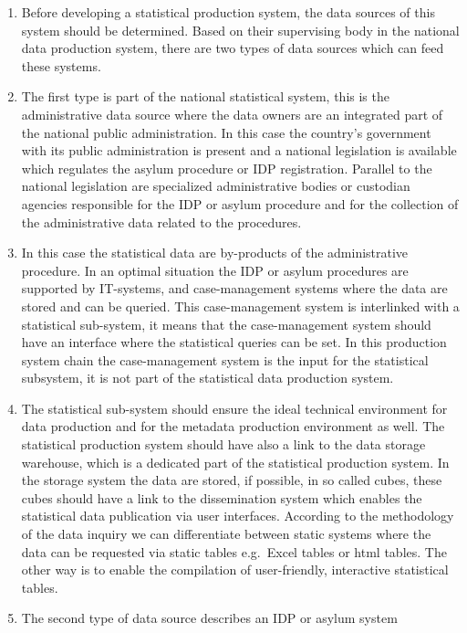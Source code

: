 \documentclass[
]{article}
\begin{document}
\begin{enumerate}
\def\labelenumi{\arabic{enumi}.}
\setcounter{enumi}{271}
\item
  Before developing a statistical production system, the data sources
  of this system should be determined. Based on their supervising body
  in the national data production system, there are two types of data
  sources which can feed these systems.
\item
  The first type is part of the national statistical system, this is
  the administrative data source where the data owners are an
  integrated part of the national public administration. In this case
  the country's government with its public administration is present
  and a national legislation is available which regulates the asylum
  procedure or IDP registration. Parallel to the national legislation
  are specialized administrative bodies or custodian agencies
  responsible for the IDP or asylum procedure and for the collection
  of the administrative data related to the procedures.
\item
  In this case the statistical data are by-products of the
  administrative procedure. In an optimal situation the IDP or asylum
  procedures are supported by IT-systems, and case-management systems
  where the data are stored and can be queried. This case-management
  system is interlinked with a statistical sub-system, it means that
  the case-management system should have an interface where the
  statistical queries can be set. In this production system chain the
  case-management system is the input for the statistical subsystem,
  it is not part of the statistical data production system.
\item
  The statistical sub-system should ensure the ideal technical
  environment for data production and for the metadata production
  environment as well. The statistical production system should have
  also a link to the data storage warehouse, which is a dedicated part
  of the statistical production system. In the storage system the data
  are stored, if possible, in so called cubes, these cubes should have
  a link to the dissemination system which enables the statistical
  data publication via user interfaces. According to the methodology
  of the data inquiry we can differentiate between static systems
  where the data can be requested via static tables e.g.~Excel tables
  or html tables. The other way is to enable the compilation of
  user-friendly, interactive statistical tables.
\item
  The second type of data source describes an IDP or asylum system

\end{enumerate}
\end{document}
